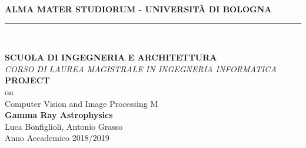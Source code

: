 \documentclass[a4paper,12pt,oneside]{book}
\begin{document}
	\begin{titlepage}
		{\large \textbf{ALMA MATER STUDIORUM - UNIVERSIT\`{A} DI BOLOGNA}}
		\rule[0.1cm]{14.7cm}{0.2mm}
		\\[1\baselineskip]
		\begin{center}
			\textbf{SCUOLA DI INGEGNERIA E ARCHITETTURA}\\[1\baselineskip]
			\textit{CORSO DI LAUREA MAGISTRALE IN INGEGNERIA INFORMATICA}\\[4\baselineskip]
			\textbf{PROJECT}\\[1\baselineskip]
			on\\ Computer Vision and Image Processing M\\[4\baselineskip]
			{\large \textbf{Gamma Ray Astrophysics}}\\[12\baselineskip]
			{\large Luca Bonfiglioli, Antonio Grasso}\\[6\baselineskip]
			{\large Anno Accademico 2018/2019}
		\end{center}
	\end{titlepage}


\frontmatter 

\tableofcontents



\newpage

\mainmatter 

\newpage
\end{document}
